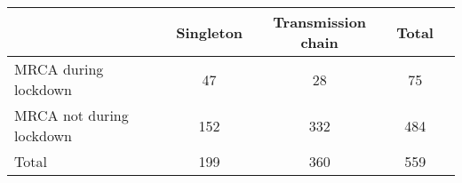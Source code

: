 \begin{tabular}{lcccc}
\hline
& Singleton & Transmission chain & Total \\ 
\hline
MRCA during lockdown &  47 &  28 &  75 \\ 
MRCA not during lockdown & 152 & 332 & 484 \\ 
Total & 199 & 360 & 559 \\ 
\hline
\end{tabular}
